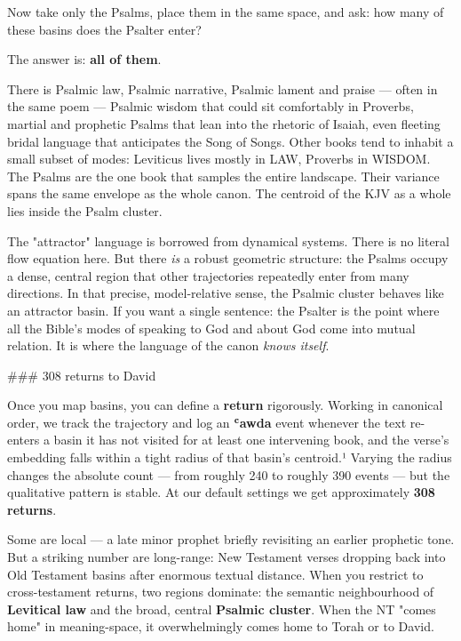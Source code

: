 \documentclass[12pt,a4paper]{article}
\begin{document}
Now take only the Psalms, place them in the same space, and ask: how many of these basins does the Psalter enter?

The answer is: \textbf{all of them}.

There is Psalmic law, Psalmic narrative, Psalmic lament and praise --- often in the same poem --- Psalmic wisdom that could sit comfortably in Proverbs, martial and prophetic Psalms that lean into the rhetoric of Isaiah, even fleeting bridal language that anticipates the Song of Songs. Other books tend to inhabit a small subset of modes: Leviticus lives mostly in LAW, Proverbs in WISDOM. The Psalms are the one book that samples the entire landscape. Their variance spans the same envelope as the whole canon. The centroid of the KJV as a whole lies inside the Psalm cluster.

The "attractor" language is borrowed from dynamical systems. There is no literal flow equation here. But there \textit{is} a robust geometric structure: the Psalms occupy a dense, central region that other trajectories repeatedly enter from many directions. In that precise, model-relative sense, the Psalmic cluster behaves like an attractor basin. If you want a single sentence: the Psalter is the point where all the Bible's modes of speaking to God and about God come into mutual relation. It is where the language of the canon \textit{knows itself}.

\#\#\# 308 returns to David

Once you map basins, you can define a \textbf{return} rigorously. Working in canonical order, we track the trajectory and log an \textbf{ʿawda} event whenever the text re-enters a basin it has not visited for at least one intervening book, and the verse's embedding falls within a tight radius of that basin's centroid.¹ Varying the radius changes the absolute count --- from roughly 240 to roughly 390 events --- but the qualitative pattern is stable. At our default settings we get approximately \textbf{308 returns}.

Some are local --- a late minor prophet briefly revisiting an earlier prophetic tone. But a striking number are long-range: New Testament verses dropping back into Old Testament basins after enormous textual distance. When you restrict to cross-testament returns, two regions dominate: the semantic neighbourhood of \textbf{Levitical law} and the broad, central \textbf{Psalmic cluster}. When the NT "comes home" in meaning-space, it overwhelmingly comes home to Torah or to David.
\end{document}
